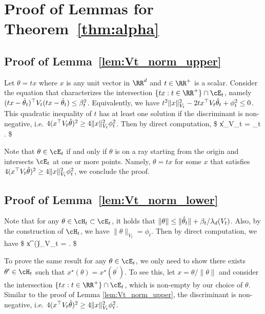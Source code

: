 






\section{Proof of Lemmas for Theorem~\ref{thm:alpha}}
\label{sec:proof_alpha}
\subsection{Proof of Lemma~\ref{lem:Vt_norm_upper}}


\proof{}
	Let $\theta = t x $ where $x$ is any unit vector in $\RR^d$ and $t\in \RR^{+}  $ is a scalar. Consider the equation that characterizes the intersection  $\{t x : t\in\RR^{+} \}\cap \cE_t $, namely
	$
	(t x - \hat{\theta}_t)^\top V_t (t x - \hat{\theta}_t) \leq  \beta_t^2
	$.
	Equivalently, we have
	$
	t^2\|x\|_{V_t}^2 - 2 t  x^\top V_t \hat{\theta}_t + \phi_t^2 \leq 0
	$. This quadratic inequality of $t$ has at least one solution if the discriminant is non-negative, i.e.
	$
	4(x^\top V_t \hat{\theta})^2 \geq 4 \|x\|_{V_t}^2 \phi_t^2 
	$.
	Then by direct computation,
	\$
	\|x\|_{V_t} \leq {} \leq {} =   {\phi_t	}.
	\$

	Note that $\theta \in \cE_t$ if and only if $\theta$ is on a ray starting from the origin and intersects $\cE_t$ at one or more points. Namely, 
	$\theta = t x $ for some $x$ that satisfies $4(x^\top V_t \hat{\theta})^2 \geq 4 \|x\|_{V_t}^2 \phi_t^2$, we conclude the proof.
	

	
\endproof
\subsection{Proof of Lemma~\ref{lem:Vt_norm_lower}}
\proof{}
Note that for any $\theta \in \cH_t \subset\cE_t$, it holds that  $\|\theta\| \leq \|\hat{\theta}_t\| +  \beta_t/\lambda_d(V_t)  $. Also, by the construction of $\cH_t$, we have $\|\theta\|_{V_t}  =  \phi_t$. Then by direct computation, we have
	\$
	\|x^\star(\theta )\|_{V_t} =  \geq {} .
	\$

To prove the same result for any $\theta \in \cE_t$, we only need to show there exists $\theta^\prime \in \cH_t$ such that $x^\star(\theta) = x^\star(\theta^\prime)$. To see this,  let $x = \theta/\|\theta\|$ and consider the  intersection  $\{t x : t\in\RR^{+}  \}\cap \cE_t$, which is non-empty by our choice of $\theta$. Similar to the proof of Lemma \ref{lem:Vt_norm_upper}, the discriminant is non-negative, i.e.
	$
	4(x^\top V_t \hat{\theta})^2 \geq 4 \|x\|_{V_t}^2 \phi_t^2 
	$. 

